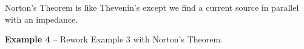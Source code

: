 \documentclass{handout}
\begin{document}
\newpage
\clearpage
\pagebreak

Norton's Theorem is like Thevenin's except we find a current source in parallel with an impedance.

\textbf{Example 4} -- Rework Example 3 with Norton's Theorem.


\newpage
\clearpage
\pagebreak

\newpage
\clearpage
\pagebreak

\newpage
\clearpage
\pagebreak
\end{document}
